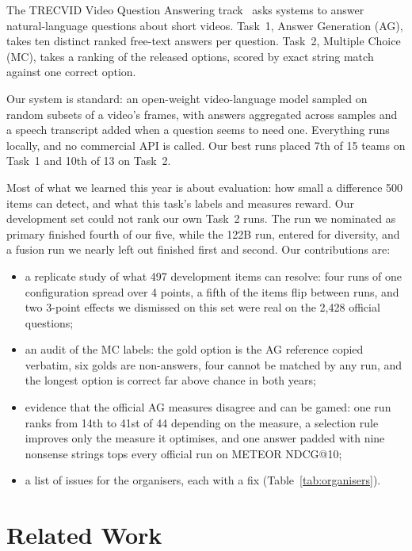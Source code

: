 \documentclass[sigconf,nonacm]{acmart}
\begin{document}
The TRECVID Video Question Answering track~\cite{awad2025vqa} asks systems to
answer natural-language questions about short videos. Task~1, Answer Generation
(AG), takes ten distinct ranked free-text answers per question. Task~2, Multiple
Choice (MC), takes a ranking of the released options, scored by exact string
match against one correct option.

Our system is standard: an open-weight video-language model sampled on random
subsets of a video's frames, with answers aggregated across samples and a speech
transcript added when a question seems to need one. Everything runs locally, and
no commercial API is called. Our best runs placed 7th of 15 teams on Task~1 and
10th of 13 on Task~2.

Most of what we learned this year is about evaluation: how small a difference
500 items can detect, and what this task's labels and measures reward. Our
development set could not rank our own Task~2 runs. The run we nominated as primary finished fourth of our five, while the 122B run,
entered for diversity, and a fusion run we nearly left out finished first and
second. Our contributions are:
\begin{itemize}
\item a replicate study of what 497 development items can resolve: four runs of
one configuration spread over 4 points, a fifth of the items flip between runs,
and two 3-point effects we dismissed on this set were real on the 2,428 official
questions;
\item an audit of the MC labels: the gold option is the AG reference copied
verbatim, six golds are non-answers, four cannot be matched by any run, and the
longest option is correct far above chance in both years;
\item evidence that the official AG measures disagree and can be gamed: one run
ranks from 14th to 41st of 44 depending on the measure, a selection rule improves
only the measure it optimises, and one answer padded with nine nonsense strings
tops every official run on METEOR NDCG@10;
\item a list of issues for the organisers, each with a fix
(Table~\ref{tab:organisers}).
\end{itemize}

\section{Related Work}
\end{document}
